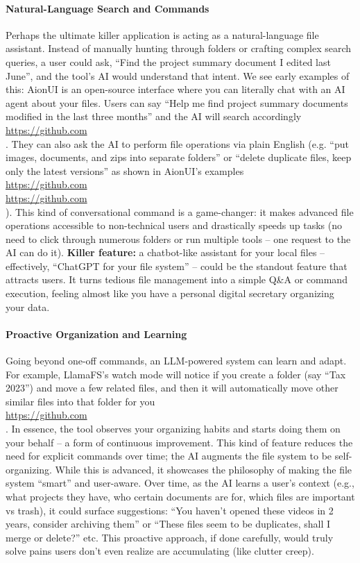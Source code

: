 \documentclass[11pt]{article}
\begin{document}
\paragraph{Natural-Language Search and Commands} Perhaps the ultimate killer application is acting as a natural-language file assistant. Instead of manually hunting through folders or crafting complex search queries, a user could ask, “Find the project summary document I edited last June”, and the tool’s AI would understand that intent. We see early examples of this: AionUI is an open-source interface where you can literally chat with an AI agent about your files. Users can say “Help me find project summary documents modified in the last three months” and the AI will search accordingly \\ \url{https://github.com} \\ . They can also ask the AI to perform file operations via plain English (e.g. “put images, documents, and zips into separate folders” or “delete duplicate files, keep only the latest versions” as shown in AionUI’s examples \\ \url{https://github.com} \\ \url{https://github.com} \\ ). This kind of conversational command is a game-changer: it makes advanced file operations accessible to non-technical users and drastically speeds up tasks (no need to click through numerous folders or run multiple tools -- one request to the AI can do it). \textbf{Killer feature:} a chatbot-like assistant for your local files -- effectively, “ChatGPT for your file system” -- could be the standout feature that attracts users. It turns tedious file management into a simple Q\&A or command execution, feeling almost like you have a personal digital secretary organizing your data.

\paragraph{Proactive Organization and Learning} Going beyond one-off commands, an LLM-powered system can learn and adapt. For example, LlamaFS’s watch mode will notice if you create a folder (say “Tax 2023”) and move a few related files, and then it will automatically move other similar files into that folder for you \\ \url{https://github.com} \\ . In essence, the tool observes your organizing habits and starts doing them on your behalf -- a form of continuous improvement. This kind of feature reduces the need for explicit commands over time; the AI augments the file system to be self-organizing. While this is advanced, it showcases the philosophy of making the file system “smart” and user-aware. Over time, as the AI learns a user’s context (e.g., what projects they have, who certain documents are for, which files are important vs trash), it could surface suggestions: “You haven’t opened these videos in 2 years, consider archiving them” or “These files seem to be duplicates, shall I merge or delete?” etc. This proactive approach, if done carefully, would truly solve pains users don’t even realize are accumulating (like clutter creep).
\end{document}
